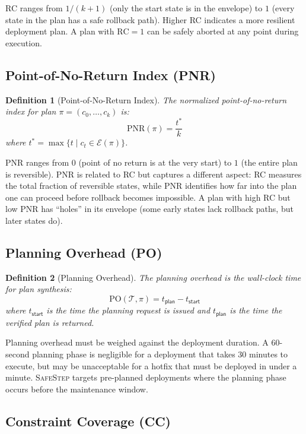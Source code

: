 \documentclass[10pt,twocolumn]{article}
\newtheorem{definition}{Definition}
\newcommand{\safestep}{\textsc{SafeStep}}
\begin{document}
RC ranges from $1/(k+1)$ (only the start state is in the
envelope) to $1$ (every state in the plan has a safe rollback
path). Higher RC indicates a more resilient deployment plan.
A plan with $\mathrm{RC} = 1$ can be safely aborted at any
point during execution.

\subsection{Point-of-No-Return Index (PNR)}

\begin{definition}[Point-of-No-Return Index]
The \emph{normalized point-of-no-return index} for plan
$\pi = (c_0, \ldots, c_k)$ is:
\[
  \mathrm{PNR}(\pi) = \frac{t^{*}}{k}
\]
where $t^{*} = \max\{t \mid c_t \in \mathcal{E}(\pi)\}$.
\end{definition}

PNR ranges from $0$ (point of no return is at the very start)
to $1$ (the entire plan is reversible). PNR is related to RC
but captures a different aspect: RC measures the total fraction
of reversible states, while PNR identifies how far into the
plan one can proceed before rollback becomes impossible. A plan
with high RC but low PNR has ``holes'' in its envelope (some
early states lack rollback paths, but later states do).

\subsection{Planning Overhead (PO)}

\begin{definition}[Planning Overhead]
The \emph{planning overhead} is the wall-clock time for plan
synthesis:
\[
  \mathrm{PO}(\mathcal{T}, \pi) = t_{\mathsf{plan}} -
  t_{\mathsf{start}}
\]
where $t_{\mathsf{start}}$ is the time the planning request is
issued and $t_{\mathsf{plan}}$ is the time the verified plan
is returned.
\end{definition}

Planning overhead must be weighed against the deployment
duration. A 60-second planning phase is negligible for a
deployment that takes 30 minutes to execute, but may be
unacceptable for a hotfix that must be deployed in under a
minute. \safestep{} targets pre-planned deployments where
the planning phase occurs before the maintenance window.

\subsection{Constraint Coverage (CC)}
\end{document}
